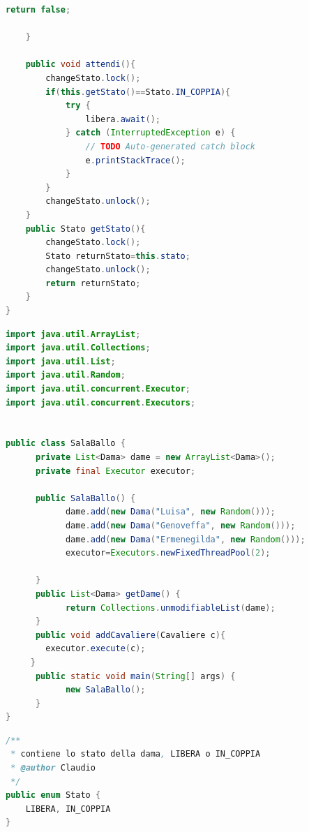 \documentclass{article}
\begin{document}
\begin{lstlisting}[language=Java]
		return false;
		
	}
	
	public void attendi(){
		changeStato.lock();
		if(this.getStato()==Stato.IN_COPPIA){
			try {
				libera.await();
			} catch (InterruptedException e) {
				// TODO Auto-generated catch block
				e.printStackTrace();
			}
		}
		changeStato.unlock();
	}
	public Stato getStato(){
		changeStato.lock();
		Stato returnStato=this.stato;
		changeStato.unlock();
		return returnStato;
	}
}

\end{lstlisting}

\begin{lstlisting}[language=Java]
import java.util.ArrayList;
import java.util.Collections;
import java.util.List;
import java.util.Random;
import java.util.concurrent.Executor;
import java.util.concurrent.Executors;


public class SalaBallo {
      private List<Dama> dame = new ArrayList<Dama>();
      private final Executor executor;
  	
      public SalaBallo() {
            dame.add(new Dama("Luisa", new Random()));
            dame.add(new Dama("Genoveffa", new Random()));
            dame.add(new Dama("Ermenegilda", new Random()));
            executor=Executors.newFixedThreadPool(2);
          	
      }
      public List<Dama> getDame() {
            return Collections.unmodifiableList(dame);
      }
      public void addCavaliere(Cavaliere c){
  		executor.execute(c);
  	 }
      public static void main(String[] args) {
            new SalaBallo();
      } 
}
\end{lstlisting}
\begin{lstlisting}[language=Java]
/**
 * contiene lo stato della dama, LIBERA o IN_COPPIA
 * @author Claudio
 */
public enum Stato {
	LIBERA, IN_COPPIA
}
\end{lstlisting}
\clearpage







\nocite{*}
\end{document}
